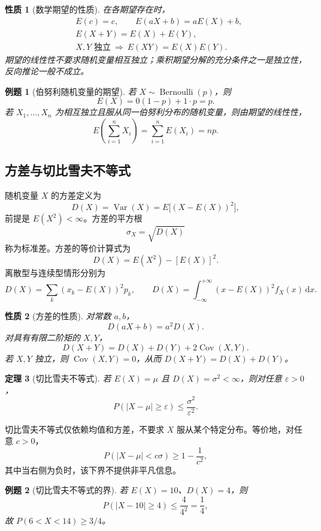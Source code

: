 \documentclass[11pt,a4paper,fontset=fandol]{ctexart}
\newtheorem{theorem}{定理}[section]
\newtheorem{property}[theorem]{性质}
\newtheorem{example}{例题}[section]
\theoremstyle{remark}
\begin{document}
\begin{property}[数学期望的性质]
在各期望存在时，
\[
\begin{aligned}
    &E(c)=c,\qquad E(aX+b)=aE(X)+b,\\
    &E(X+Y)=E(X)+E(Y),\\
    &X,Y\text{ 独立}\ \Longrightarrow\ E(XY)=E(X)E(Y).
\end{aligned}
\]
期望的线性性不要求随机变量相互独立；乘积期望分解的充分条件之一是独立性，反向推论一般不成立。
\end{property}

\begin{example}[伯努利随机变量的期望]
若 $X\sim\operatorname{Bernoulli}(p)$，则
\[
    E(X)=0(1-p)+1\cdot p=p.
\]
若 $X_1,\ldots,X_n$ 为相互独立且服从同一伯努利分布的随机变量，则由期望的线性性，
\[
    E\left(\sum_{i=1}^n X_i\right)=\sum_{i=1}^n E(X_i)=np.
\]
\end{example}

\subsection{方差与切比雪夫不等式}
随机变量 $X$ 的方差定义为
\[
    D(X)=\operatorname{Var}(X)=E\bigl[(X-E(X))^2\bigr],
\]
前提是 $E(X^2)<\infty$。方差的平方根
\[
    \sigma_X=\sqrt{D(X)}
\]
称为标准差。方差的等价计算式为
\[
    D(X)=E(X^2)-[E(X)]^2.
\]
离散型与连续型情形分别为
\[
    D(X)=\sum_k(x_k-E(X))^2p_k,\qquad
    D(X)=\int_{-\infty}^{+\infty}(x-E(X))^2f_X(x)\,\mathrm{d}x.
\]

\begin{property}[方差的性质]
对常数 $a,b$，
\[
    D(aX+b)=a^2D(X).
\]
对具有有限二阶矩的 $X,Y$，
\[
    D(X+Y)=D(X)+D(Y)+2\operatorname{Cov}(X,Y).
\]
若 $X,Y$ 独立，则 $\operatorname{Cov}(X,Y)=0$，从而 $D(X+Y)=D(X)+D(Y)$。
\end{property}

\begin{theorem}[切比雪夫不等式]
若 $E(X)=\mu$ 且 $D(X)=\sigma^2<\infty$，则对任意 $\varepsilon>0$，
\[
    P(|X-\mu|\geq\varepsilon)\leq\frac{\sigma^2}{\varepsilon^2}.
\]
\end{theorem}
切比雪夫不等式仅依赖均值和方差，不要求 $X$ 服从某个特定分布。等价地，对任意 $c>0$，
\[
    P(|X-\mu|<c\sigma)\geq 1-\frac{1}{c^2},
\]
其中当右侧为负时，该下界不提供非平凡信息。

\begin{example}[切比雪夫不等式的界]
若 $E(X)=10$、$D(X)=4$，则
\[
    P(|X-10|\geq 4)\leq\frac{4}{4^2}=\frac14,
\]
故 $P(6<X<14)\geq 3/4$。
\end{example}
\end{document}
